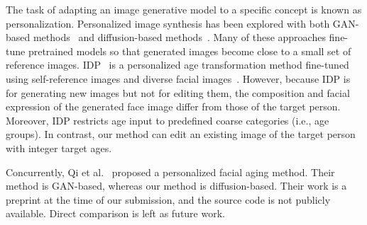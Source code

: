 The task of adapting an image generative model to a specific concept is known as personalization.
Personalized image synthesis has been explored with
both GAN-based methods~\cite{roich2022pivotal,nitzan2022mystyle,qi2024my3dgen,zeng2023mystyle++} and diffusion-based methods~\cite{gal2022textual,ruiz2022dreambooth,kumari2023multi}.
Many of these approaches fine-tune pretrained models so that generated images become close to a small set of reference images.
IDP~\cite{banerjee2023identity} is a personalized age transformation method fine-tuned using self-reference images and diverse facial images~\cite{jiang2021talk}. 
However, because IDP is for generating new images but not for editing them, the composition and facial expression of the generated face image differ from those of the target person. Moreover, IDP restricts age input to predefined coarse categories (i.e., age groups). In contrast, our method can edit an existing image of the target person with integer target ages.

Concurrently, Qi et al.~\cite{DBLP:journals/corr/abs-2411-14521} proposed a personalized facial aging method. Their method is GAN-based, whereas our method is diffusion-based. Their work is a preprint at the time of our submission, and the source code is not publicly available. Direct comparison is left as future work.